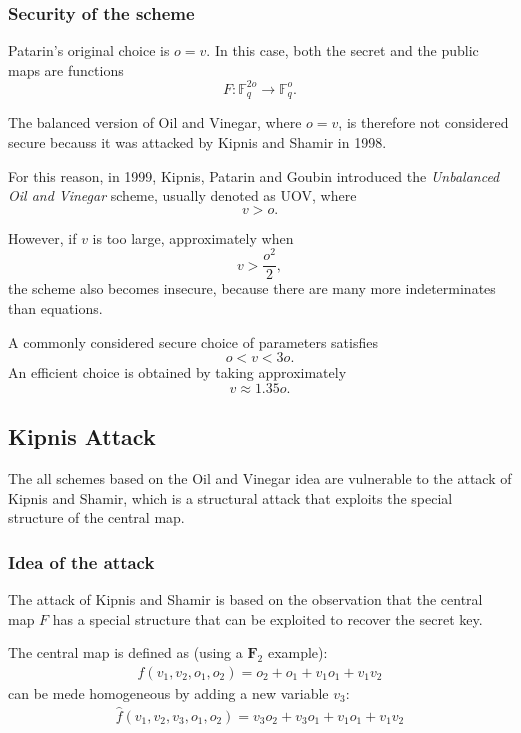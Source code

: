 \subsubsection{Security of the scheme}
\noindent
Patarin's original choice is \(o=v\). In this case, both the secret and the public maps are functions
\[
F:\mathbb F_q^{2o}\to \mathbb F_q^o.
\]

\noindent
The balanced version of Oil and Vinegar, where \(o=v\), is therefore not considered secure becauss it was attacked by Kipnis and Shamir in 1998.
\medskip

\noindent
For this reason, in 1999, Kipnis, Patarin and Goubin introduced the \textit{Unbalanced Oil and Vinegar} scheme, usually denoted as UOV, where
\[
v>o.
\]

\noindent
However, if \(v\) is too large, approximately when
\[
v>\frac{o^2}{2},
\]
the scheme also becomes insecure, because there are many more indeterminates than equations.
\medskip

\noindent
A commonly considered secure choice of parameters satisfies
\[
o<v<3o.
\]
An efficient choice is obtained by taking approximately
\[
v \approx 1.35o.
\]

\subsection{Kipnis Attack}
The all schemes based on the Oil and Vinegar idea are vulnerable to the attack of Kipnis and Shamir, which is a structural attack that exploits the special structure of the central map.

\subsubsection{Idea of the attack}
The attack of Kipnis and Shamir is based on the observation that the central map \(F\) has a special structure that can be exploited to recover the secret key.
\medskip

\noindent
The central map is defined as (using a $\mathbf{F}_2$ example):
\begin{align*}
    f(v_1,v_2,o_1,o_2) = o_2+o_1+ v_1o_1 + v_1v_2
\end{align*}
\noindent
can be mede homogeneous by adding a new variable $v_3$:
\begin{align*}
    \hat{f}(v_1,v_2,v_3,o_1,o_2) = v_3o_2+v_3o_1 + v_1o_1 + v_1v_2
\end{align*}
\vspace*{1em}


